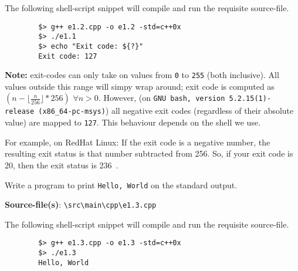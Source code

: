 \documentclass[12pt, a4paper]{article}
\begin{document}
    \noindent The following shell-script snippet will compile and run the requisite source-file.
    \begin{verbatim}
        $> g++ e1.2.cpp -o e1.2 -std=c++0x
        $> ./e1.1
        $> echo "Exit code: ${?}"
        Exit code: 127
    \end{verbatim}

    \noindent\textbf{Note:} exit-codes can only take on values from \texttt{0} to \texttt{255} (both inclusive).
    All values outside this range will simpy wrap around; exit code is computed as $(n - \lfloor\frac{n}{256}\rfloor * 256)\,\,\forall n > 0$.
    However, (on \texttt{GNU bash, version 5.2.15(1)-release (x86\_64-pc-msys)}) all negative exit codes (regardless of their absolute value) are mapped to \texttt{127}.
    This behaviour depends on the shell we use.

    \noindent For example, on RedHat Linux: If the exit code is a negative number, the resulting exit status is that number subtracted from 256.
    So, if your exit code is 20, then the exit status is 236~\cite{rhl-neg-exit-code}.

    \bigskip
    \begin{tcolorbox}[title={Exercise: 1.3}]
        Write a program to print \texttt{Hello, World} on the standard output.
    \end{tcolorbox}

    \noindent\textbf{Source-file(s)}: \texttt{\textbackslash src\textbackslash main\textbackslash cpp\textbackslash e1.3.cpp}

    \noindent The following shell-script snippet will compile and run the requisite source-file.
    \begin{verbatim}
        $> g++ e1.3.cpp -o e1.3 -std=c++0x
        $> ./e1.3
        Hello, World
    \end{verbatim}

    \pagebreak
    \printbibliography
\end{document}
